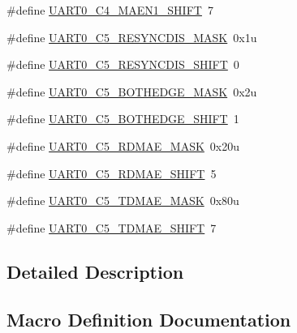 \begin{DoxyCompactItemize}
$$\#define \hyperlink{group___u_a_r_t0___register___masks_ga799c5f7dd350d4bd89d04167fa771396}{U\+A\+R\+T0\+\_\+\+C4\+\_\+\+M\+A\+E\+N1\+\_\+\+S\+H\+I\+FT}~7
\item 
\#define \hyperlink{group___u_a_r_t0___register___masks_ga6cbc7334e715b4d22547ae185dc63dda}{U\+A\+R\+T0\+\_\+\+C5\+\_\+\+R\+E\+S\+Y\+N\+C\+D\+I\+S\+\_\+\+M\+A\+SK}~0x1u
\item 
\#define \hyperlink{group___u_a_r_t0___register___masks_gaf769ed12082fb9c441d47f5cdf1117e0}{U\+A\+R\+T0\+\_\+\+C5\+\_\+\+R\+E\+S\+Y\+N\+C\+D\+I\+S\+\_\+\+S\+H\+I\+FT}~0
\item 
\#define \hyperlink{group___u_a_r_t0___register___masks_gaa34159b3052095ce96fa50cc6183de77}{U\+A\+R\+T0\+\_\+\+C5\+\_\+\+B\+O\+T\+H\+E\+D\+G\+E\+\_\+\+M\+A\+SK}~0x2u
\item 
\#define \hyperlink{group___u_a_r_t0___register___masks_ga7d1df71b9671df4f50ecb6c1e1518731}{U\+A\+R\+T0\+\_\+\+C5\+\_\+\+B\+O\+T\+H\+E\+D\+G\+E\+\_\+\+S\+H\+I\+FT}~1
\item 
\#define \hyperlink{group___u_a_r_t0___register___masks_ga75704957ea817d0ea4ef69975008dae1}{U\+A\+R\+T0\+\_\+\+C5\+\_\+\+R\+D\+M\+A\+E\+\_\+\+M\+A\+SK}~0x20u
\item 
\#define \hyperlink{group___u_a_r_t0___register___masks_ga5074684d000e97fb534e7e1dc22ea172}{U\+A\+R\+T0\+\_\+\+C5\+\_\+\+R\+D\+M\+A\+E\+\_\+\+S\+H\+I\+FT}~5
\item 
\#define \hyperlink{group___u_a_r_t0___register___masks_ga02899afc667f46e4beecd75e31b0fa90}{U\+A\+R\+T0\+\_\+\+C5\+\_\+\+T\+D\+M\+A\+E\+\_\+\+M\+A\+SK}~0x80u
\item 
\#define \hyperlink{group___u_a_r_t0___register___masks_ga932dfb6ee4de4ff77a7a7d3154718286}{U\+A\+R\+T0\+\_\+\+C5\+\_\+\+T\+D\+M\+A\+E\+\_\+\+S\+H\+I\+FT}~7
\end{DoxyCompactItemize}


\subsection{Detailed Description}


\subsection{Macro Definition Documentation}
\mbox{\label{group___u_a_r_t0___register___masks_ga84132309b565d272671dde5d912a1611}} 
